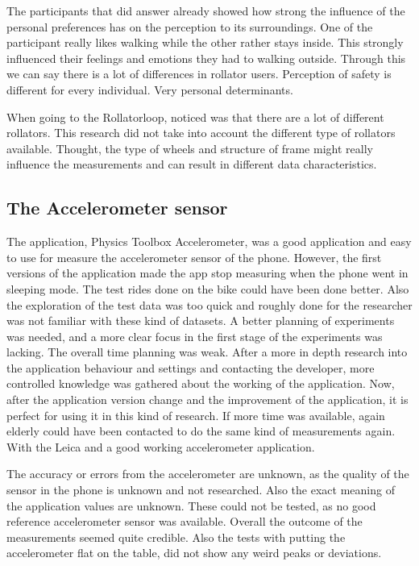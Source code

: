 The participants that did answer already showed how strong the influence of the personal preferences has on the perception to its surroundings. One of the participant really likes walking while the other rather stays inside. This strongly influenced their feelings and emotions they had to walking outside. Through this we can say there is a lot of differences in rollator users. Perception of safety is different for every individual. Very personal determinants. 


When going to the Rollatorloop, noticed was that there are a lot of different rollators. This research did not take into account the different type of rollators available. Thought, the type of wheels and structure of frame might really influence the measurements and can result in different data characteristics.



\subsection{The Accelerometer sensor}
The application, Physics Toolbox Accelerometer, was a good application and easy to use for measure the accelerometer sensor of the phone. However, the first versions of the application made the app stop measuring when the phone went in sleeping mode. The test rides done on the bike could have been done better. Also the exploration of the test data was too quick and roughly done for the researcher was not familiar with these kind of datasets. A better planning of experiments was needed, and a more clear focus in the first stage of the experiments was lacking. The overall time planning was weak. After a more in depth research into the application behaviour and settings and contacting the developer, more controlled knowledge was gathered about the working of the application. Now, after the application version change and the improvement of the application, it is perfect for using it in this kind of research. If more time was available, again elderly could have been contacted to do the same kind of measurements again. With the Leica and a good working accelerometer application. 

The accuracy or errors from the accelerometer are unknown, as the quality of the sensor in the phone is unknown and not researched. Also the exact meaning of the application values are unknown. These could not be tested, as no good reference accelerometer sensor was available. Overall the outcome of the measurements seemed quite credible. Also the tests with putting the accelerometer flat on the table, did not show any weird peaks or deviations. 


